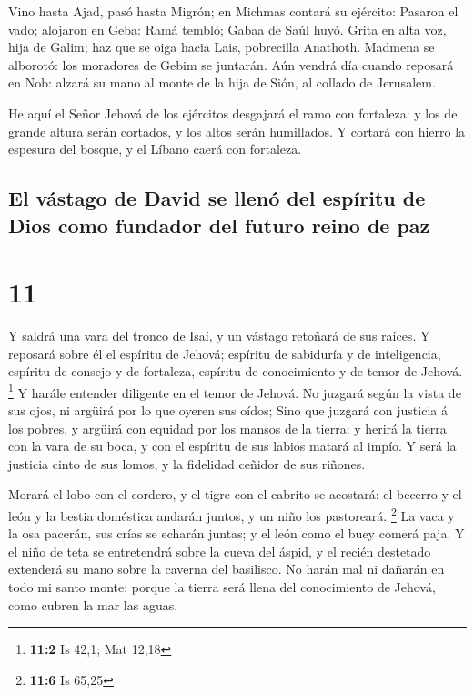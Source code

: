  Vino hasta Ajad, pasó hasta Migrón; en Michmas contará
su ejército:  Pasaron el vado; alojaron en Geba: Ramá
tembló; Gabaa de Saúl huyó.  Grita en alta voz, hija de
Galim; haz que se oiga hacia Lais, pobrecilla Anathoth. 
Madmena se alborotó: los moradores de Gebim se juntarán. 
Aún vendrá día cuando reposará en Nob: alzará su mano al monte de la
hija de Sión, al collado de Jerusalem.

 He aquí el Señor Jehová de los ejércitos desgajará el
ramo con fortaleza: y los de grande altura serán cortados, y los altos
serán humillados.  Y cortará con hierro la espesura del
bosque, y el Líbano caerá con fortaleza.

\hypertarget{el-vuxe1stago-de-david-se-llenuxf3-del-espuxedritu-de-dios-como-fundador-del-futuro-reino-de-paz}{%
\subsection{El vástago de David se llenó del espíritu de Dios como
fundador del futuro reino de
paz}\label{el-vuxe1stago-de-david-se-llenuxf3-del-espuxedritu-de-dios-como-fundador-del-futuro-reino-de-paz}}

\hypertarget{section-10}{%
\section{11}\label{section-10}}

 Y saldrá una vara del tronco de Isaí, y un vástago
retoñará de sus raíces.  Y reposará sobre él el espíritu
de Jehová; espíritu de sabiduría y de inteligencia, espíritu de consejo
y de fortaleza, espíritu de conocimiento y de temor de Jehová.
\footnote{\textbf{11:2} Is 42,1; Mat 12,18}  Y harále
entender diligente en el temor de Jehová. No juzgará según la vista de
sus ojos, ni argüirá por lo que oyeren sus oídos;  Sino
que juzgará con justicia á los pobres, y argüirá con equidad por los
mansos de la tierra: y herirá la tierra con la vara de su boca, y con el
espíritu de sus labios matará al impío.  Y será la
justicia cinto de sus lomos, y la fidelidad ceñidor de sus riñones.

 Morará el lobo con el cordero, y el tigre con el cabrito
se acostará: el becerro y el león y la bestia doméstica andarán juntos,
y un niño los pastoreará. \footnote{\textbf{11:6} Is 65,25}
 La vaca y la osa pacerán, sus crías se echarán juntas; y
el león como el buey comerá paja.  Y el niño de teta se
entretendrá sobre la cueva del áspid, y el recién destetado extenderá su
mano sobre la caverna del basilisco.  No harán mal ni
dañarán en todo mi santo monte; porque la tierra será llena del
conocimiento de Jehová, como cubren la mar las aguas.

